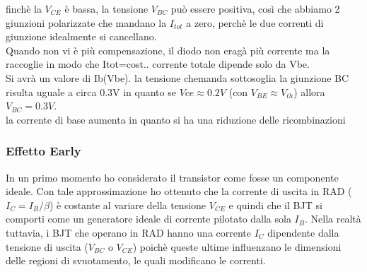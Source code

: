 finchè la $V_{CE}$ è bassa, la tensione $V_{BC}$ può essere positiva, così che abbiamo 2 giunzioni polarizzate che mandano la $I_{tot}$ a zero, perchè le due correnti di giunzione idealmente si cancellano.\\
Quando non vi è più compensazione, il diodo non eragà più corrente ma la raccoglie in modo che Itot=cost..
corrente totale dipende solo da Vbe.\\
Si avrà un valore di Ib(Vbe). la tensione chemanda sottosoglia la giunzione BC risulta uguale a circa 0.3V in quanto se $Vce \approx0.2V$ (con $V_{BE}\approx V_{th}$) allora $V_{BC}=0.3V $.\\
la corrente di base aumenta in quanto si ha una riduzione delle ricombinazioni
 
\subsubsection{Effetto Early}

In un primo momento ho considerato il transistor come fosse un componente ideale. Con tale approssimazione ho ottenuto che la corrente  di uscita in RAD ($I_C=I_B/\beta$) è costante al variare della tensione $V_{CE}$ e quindi che il BJT si comporti come un generatore ideale di corrente pilotato dalla sola $I_B$.
Nella realtà  tuttavia, i BJT che operano in RAD hanno una corrente $I_C$ dipendente dalla tensione di uscita ($V_{BC}$ o $V_{CE}$) poichè queste ultime influenzano le dimensioni delle regioni di svuotamento, le quali modificano le correnti.\\

